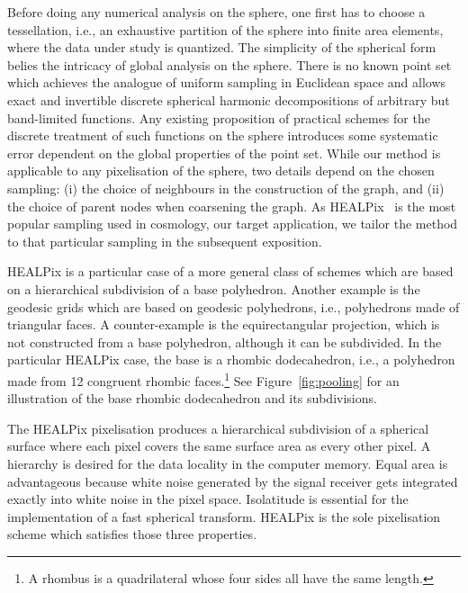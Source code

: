 \documentclass[final,twocolumn,3p,times,sort&compress]{elsarticle}
\newcommand{\figref}[1]{Figure~\ref{fig:#1}}
\newcommand{\1}{\b{1}}              %
\newcommand{\0}{\b{0}}              %
\begin{document}
Before doing any numerical analysis on the sphere, one first has to choose a tessellation, i.e., an exhaustive partition of the sphere into finite area elements, where the data under study is quantized.
The simplicity of the spherical form belies the intricacy of global analysis on the sphere.
There is no known point set which achieves the analogue of uniform sampling in Euclidean space and allows exact and invertible discrete spherical harmonic decompositions of arbitrary but band-limited functions.
Any existing proposition of practical schemes for the discrete treatment of such functions on the sphere introduces some systematic error dependent on the global properties of the point set.
While our method is applicable to any pixelisation of the sphere, two details depend on the chosen sampling: (i) the choice of neighbours in the construction of the graph, and (ii) the choice of parent nodes when coarsening the graph.
As HEALPix~\citep{gorski2005healpix} is the most popular sampling used in cosmology, our target application, we tailor the method to that particular sampling in the subsequent exposition.

HEALPix is a particular case of a more general class of schemes which are based on a hierarchical subdivision of a base polyhedron.
Another example is the geodesic grids which are based on geodesic polyhedrons, i.e., polyhedrons made of triangular faces. A counter-example is the equirectangular projection, which is not constructed from a base polyhedron, although it can be subdivided.
In the particular HEALPix case, the base is a rhombic dodecahedron, i.e., a polyhedron made from 12 congruent rhombic faces.\footnote{A rhombus is a quadrilateral whose four sides all have the same length.}
See \figref{pooling} for an illustration of the base rhombic dodecahedron and its subdivisions.

The HEALPix pixelisation produces a hierarchical subdivision of a spherical surface where each pixel covers the same surface area as every other pixel.
A hierarchy is desired for the data locality in the computer memory.
Equal area is advantageous because white noise generated by the signal receiver gets integrated exactly into white noise in the pixel space.
Isolatitude is essential for the implementation of a fast spherical transform.
HEALPix is the sole pixelisation scheme which satisfies those three properties.
\end{document}

